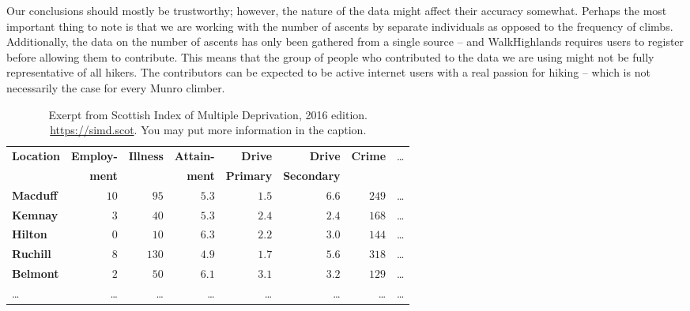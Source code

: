 \documentclass[11pt,a4paper]{article}
\begin{document}
Our conclusions should mostly be trustworthy; however, the nature of the data might affect their accuracy somewhat. Perhaps the most important thing to note is that we are working with the number of ascents by separate individuals as opposed to the frequency of climbs. Additionally, the data on the number of ascents has only been gathered from a single source – and WalkHighlands requires users to register before allowing them to contribute. This means that the group of people who contributed to the data we are using might not be fully representative of all hikers. The contributors can be expected to be active internet users with a real passion for hiking – which is not necessarily the case for every Munro climber.

\begin{table}[b]
  \caption{Exerpt from Scottish Index of Multiple Deprivation, 2016 edition.
    \url{https://simd.scot}. You may put more information in the caption.}
  \label{tab:example1}
\begin{tabular}{lrrrrrrr}
\hline\hline
\textbf{Location}&\textbf{Employ-}&\textbf{Illness}&\textbf{Attain-}&\textbf{Drive}  &\textbf{Drive}    &\textbf{Crime}&\dots\\
                 &\textbf{ment}   &                &\textbf{ment}   &\textbf{Primary}&\textbf{Secondary}&              &\\
\hline
\textbf{Macduff}&$10$&$ 95$&$5.3$&$1.5$&$6.6$&$249$&\dots\tabularnewline
\textbf{Kemnay}&$ 3$&$ 40$&$5.3$&$2.4$&$2.4$&$168$&\dots\tabularnewline
\textbf{Hilton}&$ 0$&$ 10$&$6.3$&$2.2$&$3.0$&$144$&\dots\tabularnewline
\textbf{Ruchill}&$ 8$&$130$&$4.9$&$1.7$&$5.6$&$318$&\dots\tabularnewline
\textbf{Belmont}&$ 2$&$ 50$&$6.1$&$3.1$&$3.2$&$129$&\dots\tabularnewline
\dots&\dots&\dots&\dots&\dots&\dots&\dots&\dots\tabularnewline
\hline
\end{tabular}
\end{table}

\end{document}
